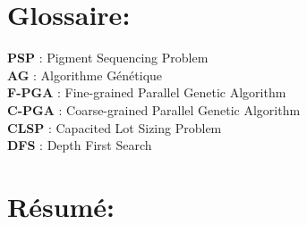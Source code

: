 \documentclass[12pt,a4paper]{article}
\begin{document}
	\newpage
	\tableofcontents
	
	\newpage
	
	\listoffigures
	
	\newpage
	
	\listoftables
	
	\newpage
	
	\listofalgorithms
	
	\newpage
	\section*{Glossaire:}
	
	\vspace{1cm}
	
	\textbf{PSP} : Pigment Sequencing Problem \\
	\hspace*{.5cm} \textbf{AG} : Algorithme Génétique \\
	\hspace*{.5cm} \textbf{F-PGA} : Fine-grained Parallel Genetic Algorithm \\
	\hspace*{.5cm} \textbf{C-PGA} : Coarse-grained Parallel Genetic Algorithm \\
	\hspace*{.5cm} \textbf{CLSP} : Capacited Lot Sizing Problem \\
	\hspace*{.5cm} \textbf{DFS} : Depth First Search
	
	
	\newpage %
	
	\section*{Résumé:}
	
	\vspace{1cm}
	
\end{document}
